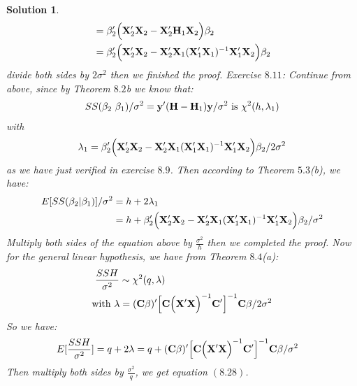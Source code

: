 \documentclass[11pt]{article}
\newtheorem{sol}{Solution}
\begin{document}
\begin{sol}
\begin{align*}
		 &=\beta_2'\Big({\bf X}_2'{\bf X}_2 - {\bf X}_2'{\bf H}_1{\bf X}_2\Big)\beta_2\\
		 &= \beta_2'\Big({\bf X}_2'{\bf X}_2 - {\bf X}_2'{\bf X}_1({\bf X}_1'{\bf X}_1)^{-1}{\bf X}_1'{\bf X}_2\Big)\beta_2
	\end{align*}
	divide both sides by $2\sigma^2$ then we finished the proof.\vskip 2mm
	Exercise $8.11$:\vskip 2mm
	Continue from above, since by Theorem $8.2$b we know that:
	\begin{align*}
		SS(\beta_2\ \beta_1)/\sigma^2  = {\bf y}'({\bf H} - {\bf H}_1){\bf y}/\sigma^2 \text{ is } \chi^2(h, \lambda_1)
	\end{align*}
	with 
	\begin{align*}
		\lambda_1 = \beta_2'\Big({\bf X}_2'{\bf X}_2 - {\bf X}_2'{\bf X}_1({\bf X}_1'{\bf X}_1)^{-1}{\bf X}_1'{\bf X}_2\Big)\beta_2/2\sigma^2
	\end{align*}
	as we have just verified in exercise $8.9$.\vskip 2mm
	Then according to Theorem $5.3$(b), we have:
	\begin{align*}
		E[SS(\beta_2|\beta_1)]/\sigma^2 &=  h + 2\lambda_1\\
		&= h + \beta_2'\Big({\bf X}_2'{\bf X}_2 - {\bf X}_2'{\bf X}_1({\bf X}_1'{\bf X}_1)^{-1}{\bf X}_1'{\bf X}_2\Big)\beta_2/\sigma^2
	\end{align*}
	Multiply both sides of the equation above by $\frac{\sigma^2}{h}$ then we completed the proof.\vskip 2mm
	Now for the general linear hypothesis, we have from Theorem $8.4$(a):
	\begin{align*}
			&\ \frac{SSH}{\sigma^2} \sim \chi^2(q, \lambda) \\
			&\text{with } \lambda = ({\bf C}\beta)'\Big[{\bf C}\Big({\bf X}'{\bf X}\Big)^{-1}{\bf C}'\Big]^{-1}{\bf C}\beta/2\sigma^2
	\end{align*}
	So we have:
	\begin{align*}
		E[\frac{SSH}{\sigma^2}] &= q + 2\lambda = q + ({\bf C}\beta)'\Big[{\bf C}\Big({\bf X}'{\bf X}\Big)^{-1}{\bf C}'\Big]^{-1}{\bf C}\beta/\sigma^2
	\end{align*}
	Then multiply both sides by $\frac{\sigma^2}{q}$, we get equation $(8.28)$.
\end{sol}
\end{document}
